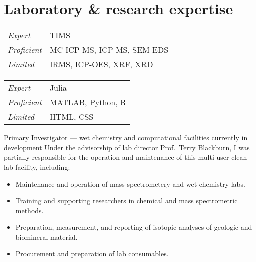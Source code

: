 \section{Laboratory \& research expertise}

\begin{tabular}{ll}
	\itshape Expert & TIMS \\
	\itshape Proficient & MC-ICP-MS, ICP-MS, SEM-EDS \\
	\itshape Limited & IRMS, ICP-OES, XRF, XRD
\end{tabular}

\begin{tabular}{ll}
	\itshape Expert & Julia \\
	\itshape Proficient & MATLAB, Python, R \\
	\itshape Limited & HTML, CSS
\end{tabular}

Primary Investigator --- wet chemistry and computational facilities currently in development
Under the advisorship of lab director Prof.~Terry Blackburn, I was partially responsible for the operation and maintenance of this multi-user clean lab facility, including:
	\begin{itemize} 
	\item Maintenance and operation of mass spectrometery and wet chemistry labs.
	\item Training and supporting researchers in chemical and mass spectrometric methods.
	\item Preparation, measurement, and reporting of isotopic analyses of geologic and biomineral material.
	\item Procurement and preparation of lab consumables.
	\end{itemize}